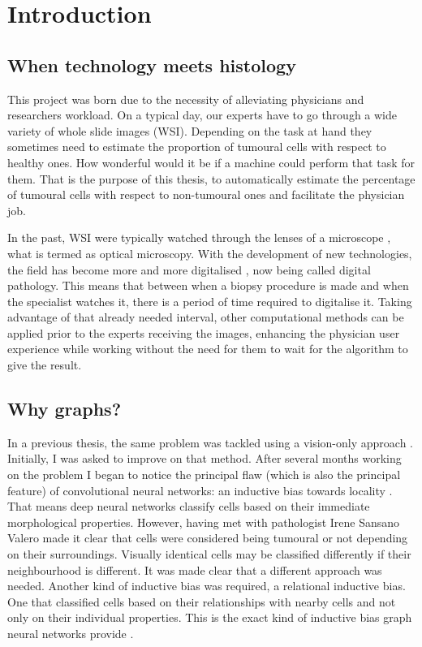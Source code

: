 \chapter{Introduction}
\section{When technology meets histology}

This project was born due to the necessity of alleviating physicians and researchers workload. On a typical day, our experts have to go through a wide variety of whole slide images (WSI). Depending on the task at hand they sometimes need to estimate the proportion of tumoural cells with respect to healthy ones. How wonderful would it be if a machine could perform that task for them. That is the purpose of this thesis, to automatically estimate the percentage of tumoural cells with respect to non-tumoural ones and facilitate the physician job.

In the past, WSI were typically watched through the lenses of a microscope \cite{Chen2011}, what is termed as optical microscopy. With the development of new technologies, the field has become more and more digitalised \cite{Kumar2020}, now being called digital pathology. This means that between when a biopsy procedure is made and when the specialist watches it, there is a period of time required to digitalise it. Taking advantage of that already needed interval, other computational methods can be applied prior to the experts receiving the images, enhancing the physician user experience while working without the need for them to wait for the algorithm to give the result.

\section{Why graphs?}

In a previous thesis, the same problem was tackled using a vision-only approach \cite{upcommons353765}. Initially, I was asked to improve on that method. After several months working on the problem I began to notice the principal flaw (which is also the principal feature) of convolutional neural networks: an inductive bias towards locality \cite{DBLP:journals/corr/CohenS16a}. That means deep neural networks classify cells based on their immediate morphological properties. However, having met with pathologist Irene Sansano Valero made it clear that cells were considered being tumoural or not depending on their surroundings. Visually identical cells may be classified differently if their neighbourhood is different. It was made clear that a different approach was needed. Another kind of inductive bias was required, a relational inductive bias. One that classified cells based on their relationships with nearby cells and not only on their individual properties. This is the exact kind of inductive bias graph neural networks provide \cite{DBLP:journals/corr/abs-2104-13478}. 